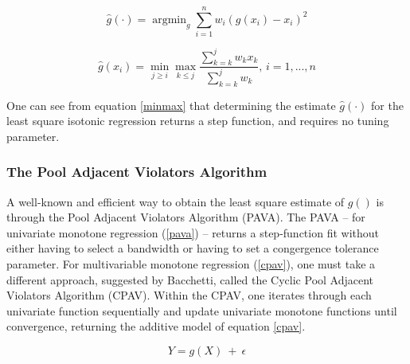 \documentclass[10pt]{olplainarticle}\usepackage[]{graphicx}\usepackage[]{color}
\DeclareMathOperator*{\argmin}{argmin}
\begin{document}
\begin{equation} \label{lseweightedisotonic}
  \hat{g}(\cdot) = \argmin_{g} \sum_{i=1}^{n}w_{i}(g(x_{i}) - x_{i})^2
\end{equation}


\begin{equation} \label{minmax}
  \hat{g}(x_{i}) = \min_{j \geq i} \max_{k \leq j} \frac{\sum_{k=k}^{j}w_{k}x_{k}}{\sum_{k=k}^{j}w_{k}} \text{,   } i = 1,...,n
\end{equation}

One can see from equation \ref{minmax} that determining the estimate $\hat{g}(\cdot)$ for the least square isotonic regression returns a step function, and requires no tuning parameter.

% 






\subsubsection{The Pool Adjacent Violators Algorithm}

A well-known and efficient way to obtain the least square estimate of $g()$ is through the Pool Adjacent Violators Algorithm (PAVA). The PAVA -- for univariate monotone regression (\ref{pava}) -- returns a step-function fit without either having to select a bandwidth or having to set a congergence tolerance parameter. For multivariable monotone regression (\ref{cpav}), one must take a different approach, suggested by Bacchetti, called the Cyclic Pool Adjacent Violators Algorithm (CPAV). Within the CPAV, one iterates through each univariate function sequentially and update univariate monotone functions until convergence, returning the additive model of equation \ref{cpav}.



\begin{equation} \label{pava}
  Y = g(X) \ +\ \epsilon
\end{equation}
\end{document}
